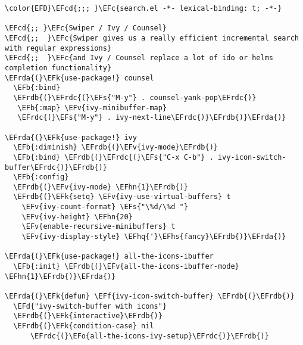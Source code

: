 \documentclass[a4wide,10pt]{article}
\newcommand{\EFc}[1]{\textcolor{EFc}{#1}} %
\newcommand{\EFcd}[1]{\textcolor{EFcd}{#1}} %
\newcommand{\EFs}[1]{\textcolor{EFs}{#1}} %
\newcommand{\EFd}[1]{\textcolor{EFd}{#1}} %
\newcommand{\EFk}[1]{\textcolor{EFk}{#1}} %
\newcommand{\EFb}[1]{\textcolor{EFb}{#1}} %
\newcommand{\EFf}[1]{\textcolor{EFf}{#1}} %
\newcommand{\EFv}[1]{\textcolor{EFv}{#1}} %
\newcommand{\EFo}[1]{\textcolor{EFo}{#1}} %
\newcommand{\EFhn}[1]{\textcolor{EFhn}{\textbf{#1}}} %
\newcommand{\EFhq}[1]{\textcolor{EFhq}{#1}} %
\newcommand{\EFhs}[1]{\textcolor{EFhs}{#1}} %
\newcommand{\EFrda}[1]{\textcolor{EFrda}{#1}} %
\newcommand{\EFrdb}[1]{\textcolor{EFrdb}{#1}} %
\newcommand{\EFrdc}[1]{\textcolor{EFrdc}{#1}} %
\begin{document}
\begin{Code}
\begin{Verbatim}
\color{EFD}\EFcd{;;; }\EFc{search.el -*- lexical-binding: t; -*-}

\EFcd{;; }\EFc{Swiper / Ivy / Counsel}
\EFcd{;;  }\EFc{Swiper gives us a really efficient incremental search with regular expressions}
\EFcd{;;  }\EFc{and Ivy / Counsel replace a lot of ido or helms completion functionality}
\EFrda{(}\EFk{use-package!} counsel
  \EFb{:bind}
  \EFrdb{(}\EFrdc{(}\EFs{"M-y"} . counsel-yank-pop\EFrdc{)}
   \EFb{:map} \EFv{ivy-minibuffer-map}
   \EFrdc{(}\EFs{"M-y"} . ivy-next-line\EFrdc{)}\EFrdb{)}\EFrda{)}

\EFrda{(}\EFk{use-package!} ivy
  \EFb{:diminish} \EFrdb{(}\EFv{ivy-mode}\EFrdb{)}
  \EFb{:bind} \EFrdb{(}\EFrdc{(}\EFs{"C-x C-b"} . ivy-icon-switch-buffer\EFrdc{)}\EFrdb{)}
  \EFb{:config}
  \EFrdb{(}\EFv{ivy-mode} \EFhn{1}\EFrdb{)}
  \EFrdb{(}\EFk{setq} \EFv{ivy-use-virtual-buffers} t
	\EFv{ivy-count-format} \EFs{"\%d/\%d "}
	\EFv{ivy-height} \EFhn{20}
	\EFv{enable-recursive-minibuffers} t
	\EFv{ivy-display-style} \EFhq{'}\EFhs{fancy}\EFrdb{)}\EFrda{)}

\EFrda{(}\EFk{use-package!} all-the-icons-ibuffer
  \EFb{:init} \EFrdb{(}\EFv{all-the-icons-ibuffer-mode} \EFhn{1}\EFrdb{)}\EFrda{)}

\EFrda{(}\EFk{defun} \EFf{ivy-icon-switch-buffer} \EFrdb{(}\EFrdb{)}
  \EFd{"ivy-switch-buffer with icons"}
  \EFrdb{(}\EFk{interactive}\EFrdb{)}
  \EFrdb{(}\EFk{condition-case} nil
      \EFrdc{(}\EFo{all-the-icons-ivy-setup}\EFrdc{)}\EFrdb{)}


\end{Verbatim}
\end{Code}
\end{document}
